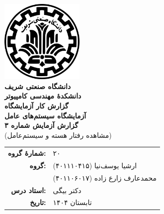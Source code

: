 \documentclass[12pt]{article}
\newcommand{\persianordinal}[1]{%
	\ifcase#1
	\or اول%
	\or دوم%
	\or سوم%
	\or چهارم%
	\or پنجم%
	\or ششم%
	\or هفتم%
	\or هشتم%
	\or نهم%
	\or دهم%
	\or یازدهم%
	\or دوازدهم%
	\or سیزدهم%
	\or چهاردهم%
	\or پانزدهم%
	\or شانزدهم%
	\or هفدهم%
	\or هجدهم%
	\or نوزدهم%
	\or بیستم%
	\else #1\fi
}
\newcommand{\persianordinalpage}{\persianfont\persianordinal{\value{page}}}
\begin{document}
	
	\begin{titlepage}
		\centering
		\vspace*{1cm}
		\includegraphics[width=4cm]{sharif.png}\\[1.5cm]
		{\Large\textbf{دانشگاه صنعتی شریف}}\\[0.5cm]
		{\large\textbf{دانشکدهٔ مهندسی کامپیوتر}}\\[1.5cm]
		{\Huge\textbf{گزارش کار آزمایشگاه}}\\[0.5cm]
		{\LARGE\textbf{آزمایشگاه سیستم‌های عامل}}\\[2cm]
		
		\textbf{گزارش آزمایش شماره ۳}\\
		(مشاهده رفتار هسته و سیستم‌عامل)
		
		\vfill
		\begin{tabular}{rl}
			\textbf{شمارهٔ گروه:} & ۲۰ \\
			\textbf{گروه:} &
			ارشیا یوسف‌نیا (۴۰۱۱۱۰۴۱۵) \\
			& محمدعارف زارع زاده (۴۰۱۱۰۶۰۱۷) \\
			\textbf{استاد درس:} & دکتر بیگی \\
			\textbf{تاریخ:} & تابستان ۱۴۰۴ \\
		\end{tabular}
	\end{titlepage}
	
	\clearpage
	\setcounter{page}{1}
	\renewcommand{\thepage}{\persianordinalpage}
	
	\tableofcontents
	\clearpage
	\listoffigures
	
	\clearpage
	\setcounter{page}{1}
	\renewcommand{\thepage}{\persianfont\arabic{page}}
	
	
\end{document}
